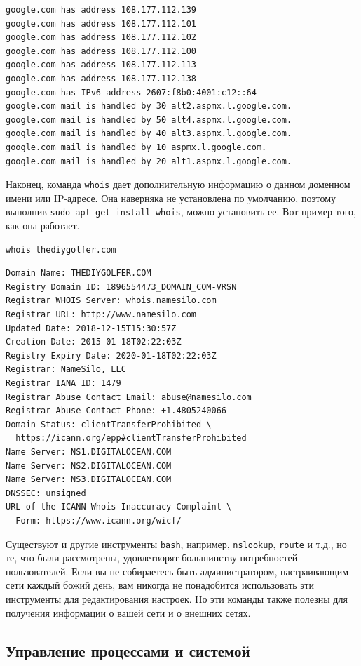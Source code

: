 \documentclass[12pt]{article}
\begin{document}
\begin{verbatim}
google.com has address 108.177.112.139
google.com has address 108.177.112.101
google.com has address 108.177.112.102
google.com has address 108.177.112.100
google.com has address 108.177.112.113
google.com has address 108.177.112.138
google.com has IPv6 address 2607:f8b0:4001:c12::64
google.com mail is handled by 30 alt2.aspmx.l.google.com.
google.com mail is handled by 50 alt4.aspmx.l.google.com.
google.com mail is handled by 40 alt3.aspmx.l.google.com.
google.com mail is handled by 10 aspmx.l.google.com.
google.com mail is handled by 20 alt1.aspmx.l.google.com.
\end{verbatim}

Наконец, команда \texttt{whois} дает дополнительную информацию о данном
доменном имени или IP-адресе. Она наверняка не установлена по умолчанию,
поэтому выполнив \texttt{sudo\ apt-get\ install\ whois}, можно
установить ее. Вот пример того, как она работает.
\begin{verbatim}
whois thediygolfer.com
\end{verbatim}

\begin{verbatim}
Domain Name: THEDIYGOLFER.COM
Registry Domain ID: 1896554473_DOMAIN_COM-VRSN
Registrar WHOIS Server: whois.namesilo.com
Registrar URL: http://www.namesilo.com
Updated Date: 2018-12-15T15:30:57Z
Creation Date: 2015-01-18T02:22:03Z
Registry Expiry Date: 2020-01-18T02:22:03Z
Registrar: NameSilo, LLC
Registrar IANA ID: 1479
Registrar Abuse Contact Email: abuse@namesilo.com
Registrar Abuse Contact Phone: +1.4805240066
Domain Status: clientTransferProhibited \
  https://icann.org/epp#clientTransferProhibited
Name Server: NS1.DIGITALOCEAN.COM
Name Server: NS2.DIGITALOCEAN.COM
Name Server: NS3.DIGITALOCEAN.COM
DNSSEC: unsigned
URL of the ICANN Whois Inaccuracy Complaint \
  Form: https://www.icann.org/wicf/
\end{verbatim}

Существуют и другие инструменты \texttt{bash}, например, \texttt{nslookup},
\texttt{route} и т.д., но те, что были рассмотрены, удовлетворят
большинству потребностей пользователей. Если вы не собираетесь быть
администратором, настраивающим сети каждый божий день, вам никогда не
понадобится использовать эти инструменты для редактирования настроек. Но
эти команды также полезны для получения информации о вашей сети и о
внешних сетях.

\hypertarget{Process-Management-and-System-Management}{%
\subsection{\texorpdfstring{\protect\hyperlink{Process-Management-and-System-Management}{}Управление
процессами и
системой}{Управление процессами и системой}}\label{Process-Management-and-System-Management}}
\end{document}
